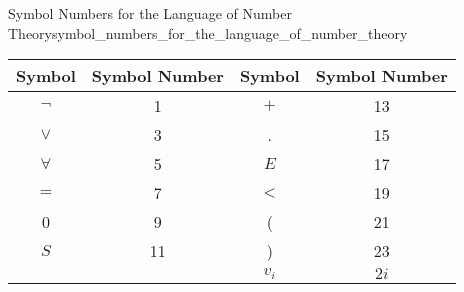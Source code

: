\begin{definition}
{Symbol Numbers for the Language of Number
Theory}{symbol_numbers_for_the_language_of_number_theory}
\begin{center}
    \begin{tabular}{||c|c||c|c||}
    \hline Symbol & Symbol Number & Symbol & Symbol Number \\
    \hline\(\neg\) & 1 & \(+\) & 13 \\
    \(\lor \) & 3 & \(\). & 15 \\
    \(\forall\) & 5 & \(E\) & 17 \\
    \( = \) & 7 & \(<\) & 19 \\
    0 & 9 & (& 21 \\
    \(S\) & 11 &) & 23 \\
    & & \(v_{i}\) & \(2 i\) \\
    \hline
    \end{tabular}
\end{center}
\end{definition}
